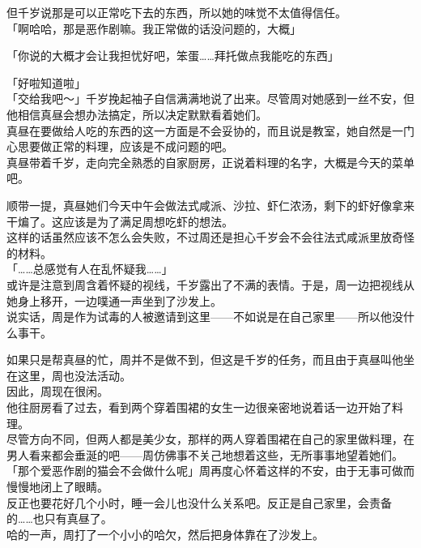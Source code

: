 但千岁说那是可以正常吃下去的东西，所以她的味觉不太值得信任。\\

「啊哈哈，那是恶作剧嘛。我正常做的话没问题的，大概」

「你说的大概才会让我担忧好吧，笨蛋……拜托做点我能吃的东西」

「好啦知道啦」\\

「交给我吧～」千岁挽起袖子自信满满地说了出来。尽管周对她感到一丝不安，但他相信真昼会想办法搞定，所以决定默默看着她们。\\

真昼在要做给人吃的东西的这一方面是不会妥协的，而且说是教室，她自然是一门心思要做正常的料理，应该是不成问题的吧。\\

真昼带着千岁，走向完全熟悉的自家厨房，正说着料理的名字，大概是今天的菜单吧。

顺带一提，真昼她们今天中午会做法式咸派、沙拉、虾仁浓汤，剩下的虾好像拿来干煸了。这应该是为了满足周想吃虾的想法。\\

这样的话虽然应该不怎么会失败，不过周还是担心千岁会不会往法式咸派里放奇怪的材料。\\

「……总感觉有人在乱怀疑我……」\\

或许是注意到周含着怀疑的视线，千岁露出了不满的表情。于是，周一边把视线从她身上移开，一边噗通一声坐到了沙发上。\\

说实话，周是作为试毒的人被邀请到这里——不如说是在自己家里——所以他没什么事干。

如果只是帮真昼的忙，周并不是做不到，但这是千岁的任务，而且由于真昼叫他坐在这里，周也没法活动。\\

因此，周现在很闲。\\

他往厨房看了过去，看到两个穿着围裙的女生一边很亲密地说着话一边开始了料理。\\

尽管方向不同，但两人都是美少女，那样的两人穿着围裙在自己的家里做料理，在男人看来都会垂涎的吧——周仿佛事不关己地想着这些，无所事事地望着她们。\\

「那个爱恶作剧的猫会不会做什么呢」周再度心怀着这样的不安，由于无事可做而慢慢地闭上了眼睛。\\

反正也要花好几个小时，睡一会儿也没什么关系吧。反正是自己家里，会责备的……也只有真昼了。\\

哈的一声，周打了一个小小的哈欠，然后把身体靠在了沙发上。
